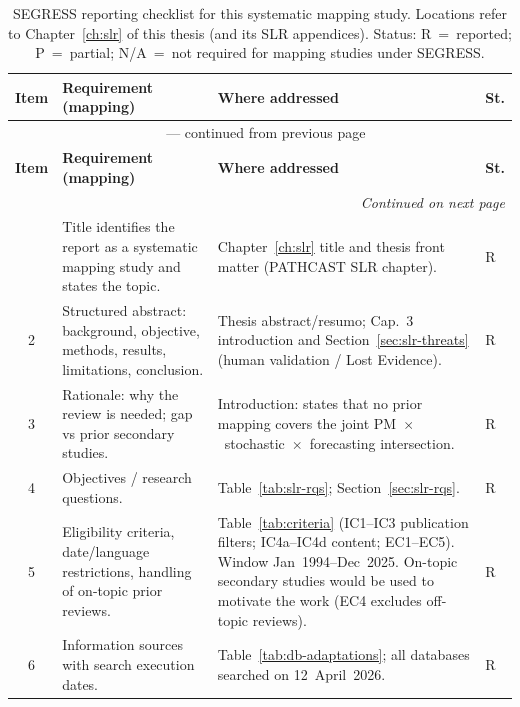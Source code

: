 
\begin{longtable}{c p{4.4cm} p{6.6cm} l}
\caption{SEGRESS reporting checklist for this systematic mapping study.
Locations refer to Chapter~\ref{ch:slr} of this thesis (and its SLR appendices). Status: R~=~reported;
P~=~partial; N/A~=~not required for mapping studies under SEGRESS.}
\label{tab:segress-checklist}\\
\toprule
\textbf{Item} & \textbf{Requirement (mapping)} & \textbf{Where addressed} & \textbf{St.} \\
\midrule
\endfirsthead
\multicolumn{4}{c}{\tablename\ \thetable{} --- continued from previous page}\\
\toprule
\textbf{Item} & \textbf{Requirement (mapping)} & \textbf{Where addressed} & \textbf{St.} \\
\midrule
\endhead
\midrule
\multicolumn{4}{r}{\emph{Continued on next page}}\\
\endfoot
\bottomrule
\endlastfoot
1 & Title identifies the report as a systematic mapping study and states the topic. & Chapter~\ref{ch:slr} title and thesis front matter (PATHCAST SLR chapter). & R \\
2 & Structured abstract: background, objective, methods, results, limitations, conclusion. & Thesis abstract/resumo; Cap.~3 introduction and Section~\ref{sec:slr-threats} (human validation / Lost Evidence). & R \\
3 & Rationale: why the review is needed; gap vs prior secondary studies. & Introduction: states that no prior mapping covers the joint PM~$\times$~stochastic~$\times$~forecasting intersection. & R \\
4 & Objectives / research questions. & Table~\ref{tab:slr-rqs}; Section~\ref{sec:slr-rqs}. & R \\
5 & Eligibility criteria, date/language restrictions, handling of on-topic prior reviews. & Table~\ref{tab:criteria} (IC1--IC3 publication filters; IC4a--IC4d content; EC1--EC5). Window Jan~1994--Dec~2025. On-topic secondary studies would be used to motivate the work (EC4 excludes off-topic reviews). & R \\
6 & Information sources with search execution dates. & Table~\ref{tab:db-adaptations}; all databases searched on 12~April~2026. & R \\

\end{longtable}
